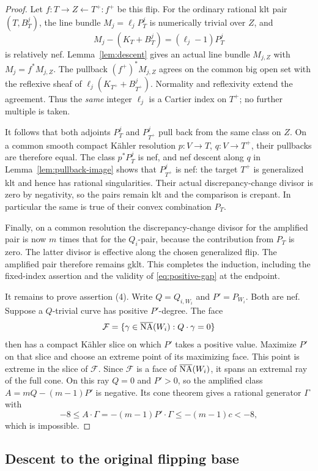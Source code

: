 \begin{proof}
Let $f:T\to Z\leftarrow T^+:f^+$ be this flip.  For the ordinary
rational klt pair $(T,B^j_T)$, the line bundle
$M_j=\ell_jP^j_T$ is numerically trivial over $Z$, and
\[
 M_j-(K_T+B^j_T)=(\ell_j-1)P^j_T
\]
is relatively nef.  Lemma~\ref{lem:descent} gives an actual line
bundle $M_{j,Z}$ with $M_j=f^*M_{j,Z}$.
The pullback $(f^+)^*M_{j,Z}$ agrees on the common big open set with
the reflexive sheaf of $\ell_j(K_{T^+}+B^j_{T^+})$.  Normality and
reflexivity extend the agreement.  Thus the \emph{same} integer
$\ell_j$ is a Cartier index on $T^+$; no further multiple is taken.

It follows that both adjoints $P^j_T$ and $P^j_{T^+}$ pull back from
the same class on $Z$.  On a common smooth compact Kähler resolution
$p:V\to T$, $q:V\to T^+$, their pullbacks are therefore equal.
The class $p^*P^j_T$ is nef, and nef descent along $q$ in
Lemma~\ref{lem:pullback-image} shows that $P^j_{T^+}$ is nef: the target
$T^+$ is generalized klt and hence has rational singularities.
Their actual discrepancy-change divisor is zero by negativity, so
the pairs remain klt and the comparison is crepant.
In particular the same is true of their convex combination $P_T$.

Finally, on a common resolution the discrepancy-change divisor for
the amplified pair is now $m$ times that for the $Q_i$-pair, because
the contribution from $P_T$ is zero.  The latter divisor is effective
along the chosen generalized flip.  The amplified pair therefore
remains gklt.  This completes the induction, including the fixed-index
assertion and the validity of \eqref{eq:positive-gap} at the endpoint.

It remains to prove assertion (4).  Write $Q=Q_{i,W_i}$ and
$P'=P_{W_i}$.  Both are nef.  Suppose a $Q$-trivial curve has positive
$P'$-degree.  The face
\[
 \mathcal F=\{\gamma\in\overline{\mathrm{NA}}(W_i):Q\cdot\gamma=0\}
\]
then has a compact Kähler slice on which $P'$ takes a positive value.
Maximize $P'$ on that slice and choose an extreme point of its
maximizing face.  This point is extreme in the slice of $\mathcal F$.
Since $\mathcal F$ is a face of $\overline{\mathrm{NA}}(W_i)$, it spans an extremal ray
of the full cone.  On this ray $Q=0$ and $P'>0$, so the amplified
class $A=mQ-(m-1)P'$ is negative.  Its cone theorem gives a rational
generator $\Gamma$ with
\[
 -8\le A\cdot\Gamma
      =-(m-1)P'\cdot\Gamma
      \le-(m-1)c<-8,
\]
which is impossible.
\end{proof}

\subsection{Descent to the original flipping base}

